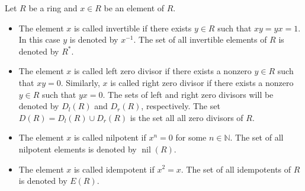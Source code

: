 \begin{definition}
Let $R$ be a ring and $x\in R$ be an element of $R$.
\begin{itemize}
\item The element $x$ is called invertible if there exists $y\in R$ such that $xy = yx = 1$.
In this case $y$ is denoted by $x^{-1}$.
The set of all invertible elements of $R$ is denoted by $R^*$.

\item The element $x$ is called left zero divisor if there exists a nonzero $y\in R$ such that $xy = 0$.
Similarly, $x$ is called right zero divisor if there exists a nonzero $y\in R$ such that $yx = 0$.
The sets of left and right zero divisors will be denoted by $D_l(R)$ and $D_r(R)$, respectively.
The set $D(R) = D_l(R) \cup D_r(R)$ is the set all all zero divisors of $R$.

\item The element $x$ is called nilpotent if $x^n = 0$ for some $n\in \mathbb N$.
The set of all nilpotent elements is denoted by $\operatorname{nil}(R)$.

\item The element $x$ is called idempotent if $x^2 = x$.
The set of all idempotents of $R$ is denoted by $E(R)$.

\end{itemize}
\end{definition}

